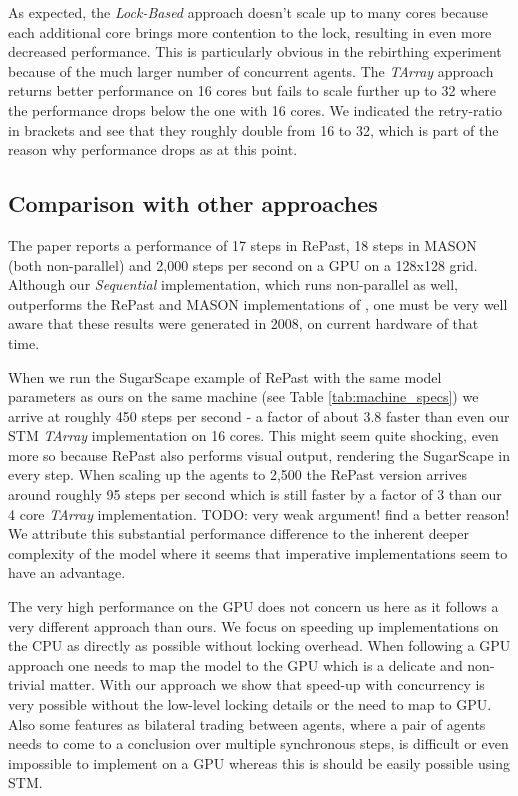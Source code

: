 As expected, the \textit{Lock-Based} approach doesn't scale up to many cores because each additional core brings more contention to the lock, resulting in even more decreased performance. This is particularly obvious in the rebirthing experiment because of the much larger number of concurrent agents. The \textit{TArray} approach returns better performance on 16 cores but fails to scale further up to 32 where the performance drops below the one with 16 cores. We indicated the retry-ratio in brackets and see that they roughly double from 16 to 32, which is part of the reason why performance drops as at this point. 

%

\subsection{Comparison with other approaches}
The paper \cite{lysenko_framework_2008} reports a performance of 17 steps in RePast, 18 steps in MASON (both non-parallel) and 2,000 steps per second on a GPU on a 128x128 grid. Although our \textit{Sequential} implementation, which runs non-parallel as well, outperforms the RePast and MASON implementations of \cite{lysenko_framework_2008}, one must be very well aware that these results were generated in 2008, on current hardware of that time.

When we run the SugarScape example of RePast with the same model parameters as ours on the same machine (see Table \ref{tab:machine_specs}) we arrive at roughly 450 steps per second - a factor of about 3.8 faster than even our STM \textit{TArray} implementation on 16 cores. This might seem quite shocking, even more so because RePast also performs visual output, rendering the SugarScape in every step. When scaling up the agents to 2,500 the RePast version arrives around roughly 95 steps per second which is still faster by a factor of 3 than our 4 core \textit{TArray} implementation. 
TODO: very weak argument! find a better reason! We attribute this substantial performance difference to  the inherent deeper complexity of the model where it seems that imperative implementations seem to have an advantage. 

The very high performance on the GPU does not concern us here as it follows a very different approach than ours. We focus on speeding up implementations on the CPU as directly as possible without locking overhead. When following a GPU approach one needs to map the model to the GPU which is a delicate and non-trivial matter. With our approach we show that speed-up with concurrency is very possible without the low-level locking details or the need to map to GPU. Also some features as bilateral trading between agents, where a pair of agents needs to come to a conclusion over multiple synchronous steps, is difficult or even impossible to implement on a GPU whereas this is should be easily possible using STM.

